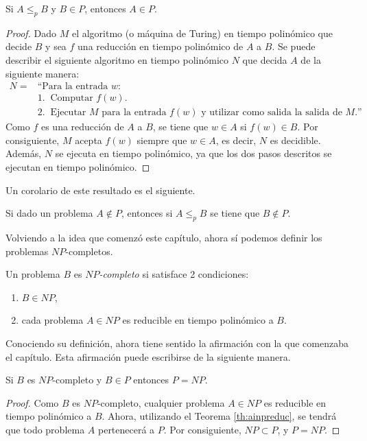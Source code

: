 \begin{theorem}\label{th:ainpreduc}
    Si $A\leq_pB$ y $B\in P$, entonces $A\in P$.
    \begin{proof}
        Dado $M$ el algoritmo (o máquina de Turing) en tiempo polinómico que decide $B$ y sea $f$ una reducción en tiempo polinómico de $A$ a $B$. Se puede describir el siguiente algoritmo en tiempo polinómico $N$ que decida $A$ de la siguiente manera:
        \begin{align*}
            N = & \text{``Para la entrada } w:\\
            & 1.\;\; \text{Computar } f(w).\\
            & 2.\;\; \text{Ejecutar } M \text{ para la entrada } f(w) \text{ y utilizar como salida la salida de } M. \text{''}
        \end{align*}
        Como $f$ es una reducción de $A$ a $B$, se tiene que $w\in A$ si $f(w)\in B$. Por consiguiente, $M$ acepta $f(w)$ siempre que $w\in A$, es decir, $N$ es decidible. Además, $N$ se ejecuta en tiempo polinómico, ya que los dos pasos descritos se ejecutan en tiempo polinómico.
    \end{proof} 
\end{theorem}

Un corolario de este resultado es el siguiente.
\begin{corollary}
    Si dado un problema $A\notin P$, entonces si $A\leq_pB$ se tiene que $B\notin P$.
\end{corollary}

Volviendo a la idea que comenzó este capítulo, ahora sí podemos definir los problemas $NP$-completos.

\begin{definition}
    Un problema $B$ es $NP$\textit{-completo} si satisface 2 condiciones:
    \begin{enumerate}
        \item $B\in NP$,
        \item cada problema $A\in NP$ es reducible en tiempo polinómico a $B$.
    \end{enumerate}    
\end{definition}

Conociendo su definición, ahora tiene sentido la afirmación con la que comenzaba el capítulo. Esta afirmación puede escribirse de la siguiente manera.

\begin{theorem}
    Si $B$ es $NP$-completo y $B\in P$ entonces $P=NP$.
    \begin{proof}
        Como $B$ es $NP$-completo, cualquier problema $A\in NP$ es reducible en tiempo polinómico a $B$. Ahora, utilizando el Teorema \ref{th:ainpreduc}, se tendrá que todo problema $A$ pertenecerá a $P$. Por consiguiente, $NP\subset P$, y $P=NP$.
    \end{proof}
\end{theorem}

